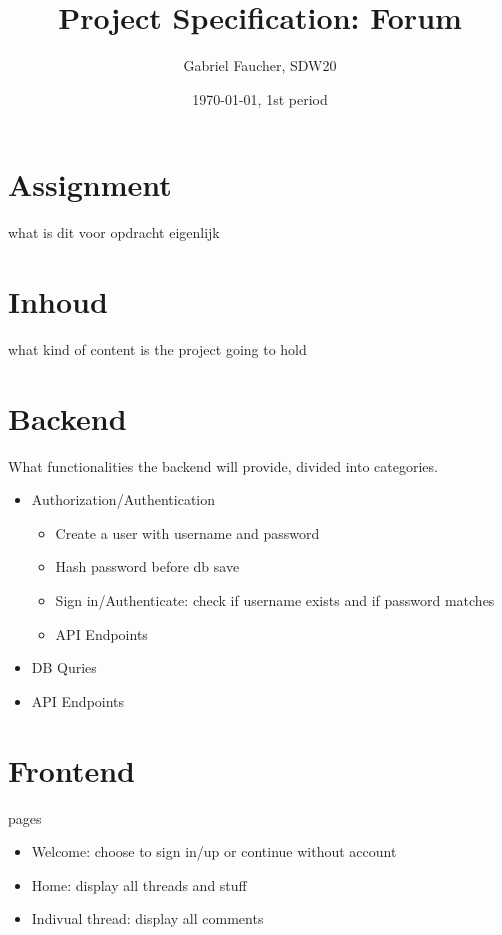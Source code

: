 \documentclass[12pt,a4paper]{article}
\title{Project Specification: Forum}
\author{Gabriel Faucher, SDW20}
\date{\today, 1st period}
\begin{document}
\maketitle

\tableofcontents
\clearpage



\section{Assignment}
what is dit voor opdracht eigenlijk
\clearpage

\section{Inhoud}
what kind of content is the project going to hold
\clearpage



\section{Backend}
What functionalities the backend will provide, divided into categories.

\begin{itemize}
  \item{Authorization/Authentication}
    \begin{itemize}
      \item{Create a user with username and password}
      \item{Hash password before db save}
      \item{Sign in/Authenticate: check if username exists and if password matches}
      \item{API Endpoints}
    \end{itemize}
  \item{DB Quries}
  \item{API Endpoints}
\end{itemize}

\clearpage

\section{Frontend}
pages
\begin{itemize}
  \item{Welcome: choose to sign in/up or continue without account}
  \item{Home: display all threads and stuff}
  \item{Indivual thread: display all comments}
\end{itemize}
\clearpage
\end{document}
